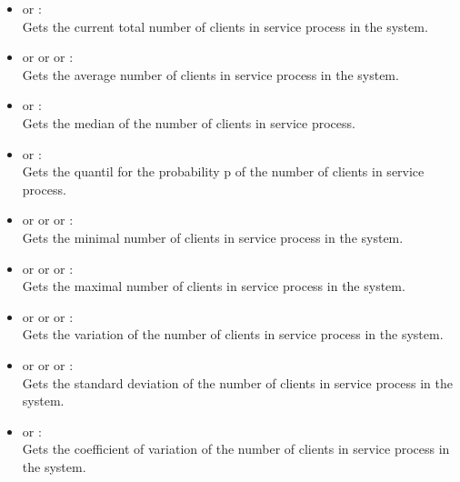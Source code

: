 \begin{itemize}    

\item
{} or :\\
Gets the current total number of clients in service process in the system.

\item
{} or  or  or :\\
Gets the average number of clients in service process in the system.

\item
{} or :\\
Gets the median of the number of clients in service process.

\item
{} or :\\
Gets the quantil for the probability p of the number of clients in service process.

\item
{} or  or  or :\\
Gets the minimal number of clients in service process in the system.

\item
{} or  or  or :\\
Gets the maximal number of clients in service process in the system.

\item
{} or  or  or :\\
Gets the variation of the number of clients in service process in the system.

\item
{} or  or  or :\\
Gets the standard deviation of the number of clients in service process in the system.

\item
{} or :\\
Gets the coefficient of variation of the number of clients in service process in the system.


\end{itemize}
